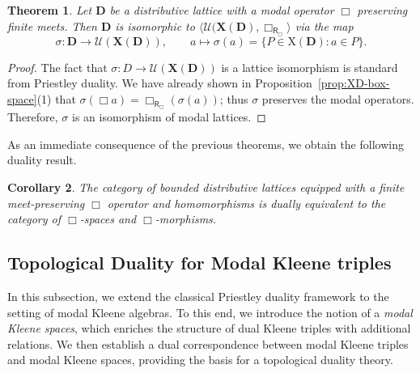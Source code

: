 \documentclass[10pt,a4paper]{amsart}
\newtheorem{theorem}{Theorem}[section]
\newtheorem{corollary}[theorem]{Corollary}
\DeclareMathOperator{\R}{\mathsf{R}}
\newcommand{\D}{\mathbf{D}}
\newcommand{\X}{\mathbf{X}}
\newcommand{\U}{\mathcal{U}}
\begin{document}
\begin{theorem}
\label{thm:sigma-box-iso}
Let $\D$ be a distributive lattice with a modal operator $\Box$ preserving finite meets. Then $\D$ is isomorphic to $\langle\U(\X(\D), \Box_{\R_\Box}\rangle$ via the map
\[
\sigma \colon \D \longrightarrow \U(\X(\D)), \qquad a \mapsto \sigma(a) = \{P \in \mathrm{X}(\D) : a \in P\}.
\]
\end{theorem}
\begin{proof}
The fact that $\sigma \colon D \to \U(\X(\D))$ is a lattice isomorphism is standard from Priestley duality. We have already shown in Proposition~\ref{prop:XD-box-space}(1) that $\sigma(\Box a) = \Box_{\R_\Box}(\sigma(a))$; thus $\sigma$ preserves the modal operators. Therefore, $\sigma$ is an isomorphism of modal lattices.
\end{proof}

As an immediate consequence of the previous theorems, we obtain the following duality result. 

\begin{corollary}
The category of bounded distributive lattices equipped with a finite meet-preserving $\Box$ operator and homomorphisms is dually equivalent to the category of $\Box$-spaces and $\Box$-morphisms.
\end{corollary} 

\subsection{Topological Duality for Modal Kleene triples}
\label{subsec:topological-duality-modal-kleene}

In this subsection, we extend the classical Priestley duality framework to the setting of modal Kleene algebras. To this end, we introduce the notion of a \emph{modal Kleene spaces}, which enriches the structure of dual Kleene triples with additional relations. We then establish a dual correspondence between modal Kleene triples and modal Kleene spaces, providing the basis for a topological duality theory.
\end{document}
